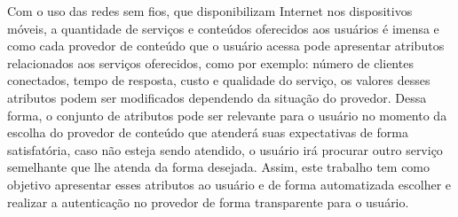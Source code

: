 \begin{resumo}
Com o uso das redes sem fios, que disponibilizam Internet nos dispositivos móveis, a quantidade de serviços e conteúdos oferecidos aos usuários é imensa e como cada provedor de conteúdo que o usuário acessa pode apresentar atributos relacionados aos serviços oferecidos, como por exemplo: número de clientes conectados, tempo de resposta, custo e qualidade do serviço, os valores desses atributos podem ser modificados dependendo da situação do provedor. Dessa forma, o conjunto de atributos pode ser relevante para o usuário no momento da escolha do provedor de conteúdo que atenderá suas expectativas de forma satisfatória, caso não esteja sendo atendido, o usuário irá procurar outro serviço semelhante que lhe atenda da forma desejada. Assim, este trabalho tem como objetivo apresentar esses atributos ao usuário e de forma automatizada escolher e realizar a autenticação no provedor de forma transparente para o usuário.
\end{resumo}	
